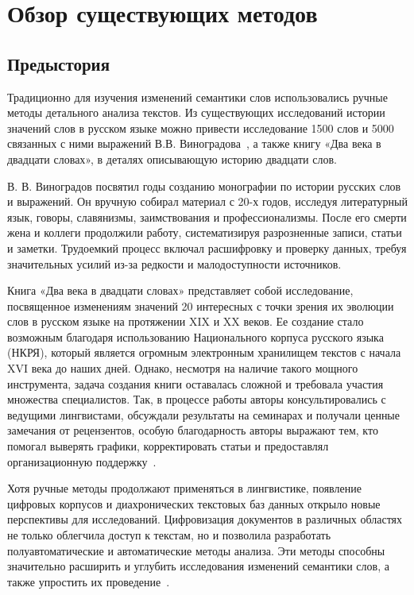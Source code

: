\documentclass[LI,VKR]{HSEUniversity}
\begin{document}
\section{Обзор существующих методов}

\subsection{Предыстория}
Традиционно для изучения изменений семантики слов использовались ручные методы детального
анализа текстов.
Из существующих исследований истории значений слов в русском языке можно привести
исследование 1500 слов и 5000 связанных с ними выражений В.В. Виноградова~\cite{VinogradovWordHistory},
а также книгу «Два века в двадцати словах», в деталях описывающую историю двадцати слов.

В. В. Виноградов посвятил годы созданию монографии по истории русских слов и выражений.
Он вручную собирал материал с 20-х годов, исследуя литературный язык, говоры, славянизмы,
заимствования и профессионализмы.
После его смерти жена и коллеги продолжили работу, систематизируя разрозненные записи, статьи и заметки.
Трудоемкий процесс включал расшифровку и проверку данных,
требуя значительных усилий из-за редкости и малодоступности источников.

Книга «Два века в двадцати словах» представляет собой исследование,
посвященное изменениям значений 20 интересных с точки зрения их эволюции слов в русском языке на
протяжении XIX и XX веков.
Ее создание стало возможным благодаря использованию Национального корпуса русского языка (НКРЯ),
который является огромным электронным хранилищем текстов с начала XVI века до наших дней.
Однако, несмотря на наличие такого мощного инструмента,
задача создания книги оставалась сложной и требовала участия множества специалистов.
Так, в процессе работы авторы консультировались с ведущими лингвистами,
обсуждали результаты на семинарах и получали ценные замечания от рецензентов,
особую благодарность авторы выражают тем, кто помогал выверять графики,
корректировать статьи и предоставлял организационную поддержку~\cite{TwoCenturies}.

Хотя ручные методы продолжают применяться в лингвистике,
появление цифровых корпусов и диахронических текстовых баз данных открыло новые перспективы для исследований.
Цифровизация документов в различных областях не только облегчила доступ к текстам,
но и позволила разработать полуавтоматические и автоматические методы анализа.
Эти методы способны значительно расширить и углубить исследования изменений семантики слов,
а также упростить их проведение~\cite{TahmasebiComputationalApproachesToSemanticChange}.
\end{document}
